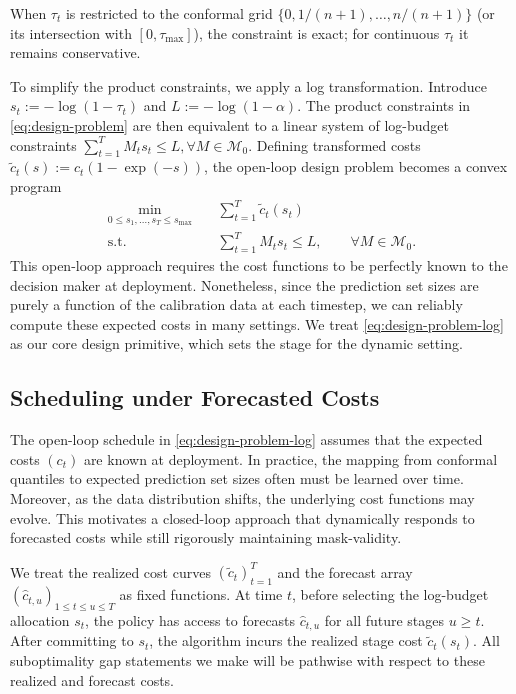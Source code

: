 \documentclass{uai2026} %
\newcommand{\1}{\mathbf{1}}
\newcommand{\mcal}{\mathcal{M}}
\begin{document}
When $\tau_t$ is restricted to the conformal grid $\{0,1/(n+1),\ldots,n/(n+1)\}$ (or its intersection with $[0,\tau_{\max}]$), the constraint is exact; for continuous $\tau_t$ it remains conservative.

To simplify the product constraints, we apply a log transformation.
Introduce $s_t:=-\log(1-\tau_t)$ and $L:=-\log(1-\alpha)$.
The product constraints in \eqref{eq:design-problem} are then equivalent to a linear system of log-budget constraints $\sum_{t=1}^{T} M_t s_t \le L,\forall M\in\mcal_{0}$. Defining transformed costs $\tilde{c}_t(s):=c_t(1-\exp(-s))$, the open-loop design problem becomes a convex program
\begin{equation}
  \label{eq:design-problem-log}
  \begin{aligned}
    \min_{0 \le s_{1},\dots,s_{T}\le s_{\max}}\quad & \sum_{t=1}^{T} \tilde{c}_t(s_t)\\
    \text{s.t.}\quad & \sum_{t=1}^{T} M_t s_t \le L,\qquad \forall M\in\mcal_{0}.
  \end{aligned}
\end{equation}
This open-loop approach requires the cost functions to be perfectly known to the decision maker at deployment.
Nonetheless, since the prediction set sizes are purely a function of the calibration data at each timestep, we can reliably compute these expected costs in many settings.
We treat \eqref{eq:design-problem-log} as our core design primitive, which sets the stage for the dynamic setting.

\subsection{Scheduling under Forecasted Costs}
\label{sec:replanning}

The open-loop schedule in \eqref{eq:design-problem-log} assumes that the expected costs $(c_t)$ are known at deployment.
In practice, the mapping from conformal quantiles to expected prediction set sizes often must be learned over time.
Moreover, as the data distribution shifts, the underlying cost functions may evolve.
This motivates a closed-loop approach that dynamically responds to forecasted costs while still rigorously maintaining mask-validity.

We treat the realized cost curves $(\tilde{c}_t)_{t=1}^{T}$ and the forecast array $(\hat{c}_{t,u})_{1 \le t \le u \le T}$ as fixed functions.
At time $t$, before selecting the log-budget allocation $s_t$, the policy has access to forecasts $\hat{c}_{t,u}$ for all future stages $u\ge t$.
After committing to $s_t$, the algorithm incurs the realized stage cost $\tilde{c}_t(s_t)$.
All suboptimality gap statements we make will be pathwise with respect to these realized and forecast costs.
\end{document}
